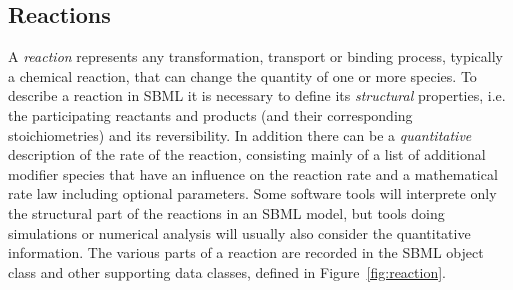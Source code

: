\subsection{Reactions}
\label{sec:reactions}

A \emph{reaction} represents any transformation, transport or
binding process, typically a chemical reaction, that can change
the quantity of one or more species. 
To describe a reaction in SBML it is necessary to define its \emph{structural}
properties, i.e. the participating reactants and products (and their 
corresponding stoichiometries) and its reversibility. 
In addition there can be a \emph{quantitative} description of the rate of the
reaction, consisting mainly of a list of additional modifier species that 
have an influence on the reaction rate and a mathematical rate law 
including optional parameters.
Some software tools will interprete only the structural part of the reactions
in an SBML model, but tools doing simulations or numerical analysis will
usually also consider the quantitative information.
The various parts of a
reaction are recorded in the SBML \Reaction object class and other
supporting data classes, defined in Figure~\vref{fig:reaction}.


